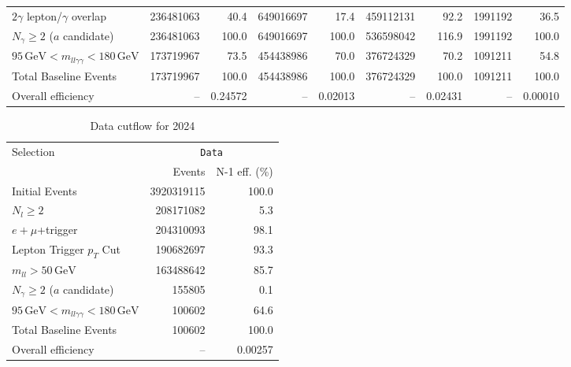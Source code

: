 \begin{table}[htbp]
{\begin{tabular}{lrrrrrrrr}
$2\gamma$ lepton/$\gamma$ overlap & 236481063 & 40.4 & 649016697 & 17.4 & 459112131 & 92.2 & 1991192 & 36.5 \\
$N_{\gamma}\geq 2$ ($a$ candidate) & 236481063 & 100.0 & 649016697 & 100.0 & 536598042 & 116.9 & 1991192 & 100.0 \\
$95\,\mathrm{GeV} < m_{ll\gamma\gamma} < 180\,\mathrm{GeV}$ & 173719967 & 73.5 & 454438986 & 70.0 & 376724329 & 70.2 & 1091211 & 54.8 \\
Total Baseline Events & 173719967 & 100.0 & 454438986 & 100.0 & 376724329 & 100.0 & 1091211 & 100.0 \\
\hline
Overall efficiency & -- & 0.24572 & -- & 0.02013 & -- & 0.02431 & -- & 0.00010 \\
\hline
\end{tabular}%
}
\end{table}

\begin{table}[htbp]
\centering
\caption{Data cutflow for 2024}
\label{tab:cutflow-data-2024}
\footnotesize
\begin{tabular}{lrr}
\hline
Selection & \multicolumn{2}{c}{\texttt{Data}} \\
 & Events & N-1 eff. (\%) \\
\hline
Initial Events & 3920319115 & 100.0 \\
$N_{l}\geq 2$ & 208171082 & 5.3 \\
$e+\mu$+trigger & 204310093 & 98.1 \\
Lepton Trigger $p_T$ Cut & 190682697 & 93.3 \\
$m_{ll} > 50\,\mathrm{GeV}$ & 163488642 & 85.7 \\
$N_{\gamma}\geq 2$ ($a$ candidate) & 155805 & 0.1 \\
$95\,\mathrm{GeV} < m_{ll\gamma\gamma} < 180\,\mathrm{GeV}$ & 100602 & 64.6 \\
Total Baseline Events & 100602 & 100.0 \\
\hline
Overall efficiency & -- & 0.00257 \\
\hline
\end{tabular}
\end{table}

